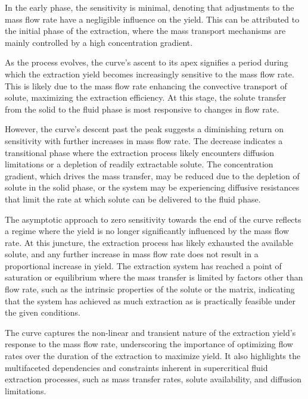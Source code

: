 \documentclass[../Article_Sensitivity_Analsysis.tex]{subfiles}
\begin{document}
	In the early phase, the sensitivity is minimal, denoting that adjustments to the mass flow rate have a negligible influence on the yield. This can be attributed to the initial phase of the extraction, where the mass transport mechanisms are mainly controlled by a high concentration gradient.
	
	As the process evolves, the curve's ascent to its apex signifies a period during which the extraction yield becomes increasingly sensitive to the mass flow rate. This is likely due to the mass flow rate enhancing the convective transport of solute, maximizing the extraction efficiency. At this stage, the solute transfer from the solid to the fluid phase is most responsive to changes in flow rate.
	
	However, the curve’s descent past the peak suggests a diminishing return on sensitivity with further increases in mass flow rate. The decrease indicates a transitional phase where the extraction process likely encounters diffusion limitations or a depletion of readily extractable solute. The concentration gradient, which drives the mass transfer, may be reduced due to the depletion of solute in the solid phase, or the system may be experiencing diffusive resistances that limit the rate at which solute can be delivered to the fluid phase.
	
	The asymptotic approach to zero sensitivity towards the end of the curve reflects a regime where the yield is no longer significantly influenced by the mass flow rate. At this juncture, the extraction process has likely exhausted the available solute, and any further increase in mass flow rate does not result in a proportional increase in yield. The extraction system has reached a point of saturation or equilibrium where the mass transfer is limited by factors other than flow rate, such as the intrinsic properties of the solute or the matrix, indicating that the system has achieved as much extraction as is practically feasible under the given conditions.
	
	The curve captures the non-linear and transient nature of the extraction yield's response to the mass flow rate, underscoring the importance of optimizing flow rates over the duration of the extraction to maximize yield. It also highlights the multifaceted dependencies and constraints inherent in supercritical fluid extraction processes, such as mass transfer rates, solute availability, and diffusion limitations.
\end{document}
